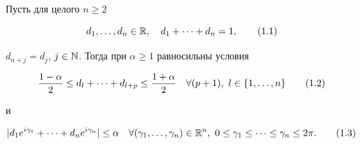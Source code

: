 \begin{lem}


Пусть для целого $n\ge 2$


\begin{equation}


d_1,\ld,d_n\in\R, \quad d_1+\cd+d_n=1, \tag{1.1}


\end{equation}


$d_{n+j}=d_j$, $j\in\Bbb N$. Тогда при $\alpha\ge1$ равносильны условия


\begin{equation}


\frac{1-\al}{2}\le d_l+\cd+d_{l+p}\le\frac{1+


\al}{2} \quad \forall (p+1),\ l\in\{1,\ld,n\} \tag{1.2}


\end{equation}


и


\begin{equation}


|d_1e^{i\gamma_1}+\cd+d_ne^{i\gamma_n}|\le\al \quad \forall


(\gamma_1,\ld,\gamma_n)\in\Rn, \


0\le\gamma_1\le\cd\le\gamma_n\le 2\pi. \tag{1.3}


\end{equation}


\end{lem}





